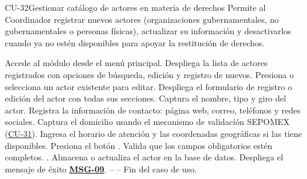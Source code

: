 \begin{UseCase}{CU-32}{Gestionar catálogo de actores en materia de derechos}{
	Permite al Coordinador registrar nuevos actores (organizaciones gubernamentales, no gubernamentales o personas físicas), actualizar su información y desactivarlos cuando ya no estén disponibles para apoyar la restitución de derechos.
}
\end{UseCase}

\begin{UCtrayectoria}
	\UCpaso[\UCactor] Accede al módulo  desde el menú principal.
	\UCpaso Despliega la lista de actores registrados con opciones de búsqueda, edición y registro de nuevos.
	\UCpaso[\UCactor] Presiona  o selecciona un actor existente para editar.
	\UCpaso Despliega el formulario de registro o edición del actor con todas sus secciones.
	\UCpaso[\UCactor] Captura el nombre, tipo y giro del actor.
	\UCpaso[\UCactor] Registra la información de contacto: página web, correo, teléfonos y redes sociales.
	\UCpaso[\UCactor] Captura el domicilio usando el mecanismo de validación SEPOMEX (\hyperlink{CU-31}{CU-31}).
	\UCpaso[\UCactor] Ingresa el horario de atención y las coordenadas geográficas si las tiene disponibles.
	\UCpaso[\UCactor] Presiona el botón .
	\UCpaso Valida que los campos obligatorios estén completos. .
	\UCpaso Almacena o actualiza el actor en la base de datos.
	\UCpaso Despliega el mensaje de éxito \hyperlink{mMSG09}{\bf MSG-09}.
	\UCpaso[] -- -- Fin del caso de uso.
\end{UCtrayectoria}

